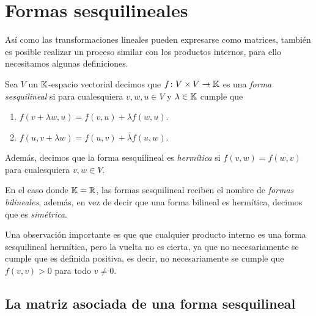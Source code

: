 \section{Formas sesquilineales}

Así como las transformaciones lineales pueden expresarse como matrices, también es posible realizar un proceso similar con los productos internos, para ello necesitamos algunas definiciones.

\begin{defi}
  Sea $V$ un $\mathbb{K}$-espacio vectorial decimos que $f\colon V\times V \to \mathbb{K}$ es una \emph{forma sesquilineal} si para cualesquiera $v,w,u \in V$ y $\lambda \in \mathbb{K}$ cumple que
    \begin{enumerate}
      \item $f(v+\lambda w, u) = f(v,u) + \lambda f(w,u)$.
      \item $f(u, v+\lambda w) = f(u,v) + \bar\lambda f(u,w)$.
    \end{enumerate}
  Además, decimos que la forma sesquilineal es \emph{hermítica} si $f(v,w) = \overline{f(w,v)}$ para cualesquiera $v,w\in V$.
\end{defi}

En el caso donde $\mathbb{K}=\mathbb{R}$, las formas sesquilineal reciben el nombre de \emph{formas bilineales}, además, en vez de decir que  una forma bilineal es hermítica, decimos que es \emph{simétrica}.

Una observación importante es que que cualquier producto interno es una forma sesquilineal hermítica, pero la vuelta no es cierta, ya que no necesariamente se cumple que es definida positiva, es decir, no necesariamente se cumple que $f(v,v)>0$ para todo $v\neq 0$.

\subsection{La matriz asociada de una forma sesquilineal}

